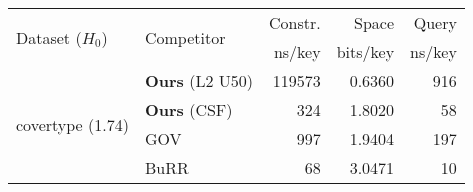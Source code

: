 
\addtolength\tabcolsep{-1.9pt}
\centering

	\begin{tabular}{ll rrr}
		\toprule
        \multirow{2}{*}{Dataset ($H_0$)} & \multirow{2}{*}{Competitor} & Constr. & Space    & Query \\
                                         &                             & ns/key  & bits/key & ns/key  \\

		
  \midrule\multirow{4}{*}{covertype (1.74)} & \textbf{Ours} (L2 U50) & 119573 & 0.6360 &  916 \\
                                            &    \textbf{Ours} (CSF) &    324 & 1.8020 &   58 \\
                                            &                    GOV &    997 & 1.9404 &  197 \\
                                            &                   BuRR &     68 & 3.0471 &   10 \\

\end{tabular}
